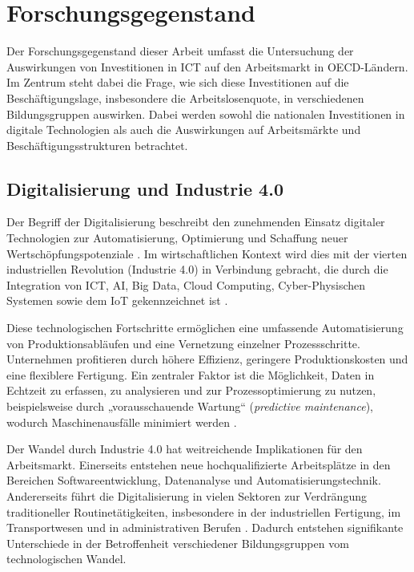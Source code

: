 
\section{Forschungsgegenstand}

Der Forschungsgegenstand dieser Arbeit umfasst die Untersuchung der Auswirkungen von 
Investitionen in \ac{ICT} auf den Arbeitsmarkt in \ac{OECD}-Ländern. Im Zentrum steht 
dabei die Frage, wie sich diese Investitionen auf die Beschäftigungslage, insbesondere 
die Arbeitslosenquote, in verschiedenen Bildungsgruppen auswirken. Dabei werden sowohl 
die nationalen Investitionen in digitale Technologien als auch die Auswirkungen auf 
Arbeitsmärkte und Beschäftigungsstrukturen betrachtet.


\subsection{Digitalisierung und Industrie 4.0}

Der Begriff der Digitalisierung beschreibt den zunehmenden Einsatz digitaler Technologien 
zur Automatisierung, Optimierung und Schaffung neuer Wertschöpfungspotenziale 
\parencite[vgl.][S. 6]{brennen2016theinternational}. Im wirtschaftlichen Kontext wird dies 
mit der vierten industriellen Revolution (Industrie 4.0) in Verbindung gebracht, die durch 
die Integration von \ac{ICT}, \ac{AI}, Big Data, Cloud Computing, Cyber-Physischen Systemen 
sowie dem \ac{IoT} gekennzeichnet ist \parencite[vgl.][S. 22]{kagermann2013recommendations}. 

Diese technologischen Fortschritte ermöglichen eine umfassende Automatisierung von 
Produktionsabläufen und eine Vernetzung einzelner Prozessschritte. Unternehmen profitieren 
durch höhere Effizienz, geringere Produktionskosten und eine flexiblere Fertigung. Ein 
zentraler Faktor ist die Möglichkeit, Daten in Echtzeit zu erfassen, zu analysieren und 
zur Prozessoptimierung zu nutzen, beispielsweise durch „vorausschauende Wartung“ 
(\textit{predictive maintenance}), wodurch Maschinenausfälle minimiert werden 
\parencite[vgl.][S. 85]{bartodziej2016theconcept}. 

Der Wandel durch Industrie 4.0 hat weitreichende Implikationen für den Arbeitsmarkt. 
Einerseits entstehen neue hochqualifizierte Arbeitsplätze in den Bereichen 
Softwareentwicklung, Datenanalyse und Automatisierungstechnik. Andererseits führt die 
Digitalisierung in vielen Sektoren zur Verdrängung traditioneller Routinetätigkeiten, 
insbesondere in der industriellen Fertigung, im Transportwesen und in administrativen 
Berufen \parencite[vgl.][S. 40]{frey2013thefuture}. Dadurch entstehen signifikante 
Unterschiede in der Betroffenheit verschiedener Bildungsgruppen vom technologischen Wandel.

